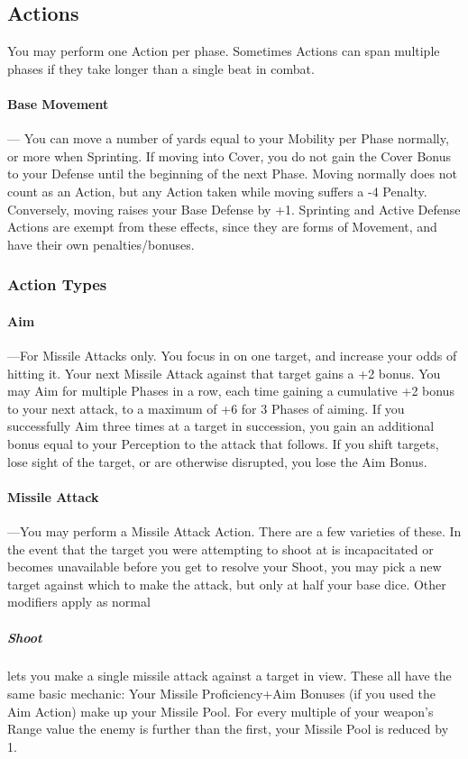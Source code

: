 \documentclass[oneside,11pt,english]{book}
\begin{document}
\subsection{Actions}\label{sec:combat-actions}
You may perform one Action per phase. Sometimes Actions can span multiple phases if they take longer
than a single beat in combat.

\paragraph{Base Movement}---\quad 
You can move a number of yards equal to your Mobility per Phase normally, or more
when Sprinting. If moving into Cover, you do not gain the Cover Bonus to your Defense until the
beginning of the next Phase.
Moving normally does not count as an Action, but any Action taken while moving suffers a -4 Penalty.
Conversely, moving raises your Base Defense by +1. Sprinting and Active Defense Actions are exempt
from these effects, since they are forms of Movement, and have their own penalties/bonuses.
\subsubsection{Action Types}
\paragraph{Aim}---\quad For Missile Attacks only. You focus in on one target,
and increase your odds of hitting it. Your next Missile Attack against that
target gains a +2 bonus. You may Aim for multiple Phases in a row, each time
gaining a cumulative +2 bonus to your next attack, to a maximum of +6 for 3
Phases of aiming. If you successfully Aim three times at a target in succession,
you gain an additional bonus equal to your Perception to the attack that
follows. If you shift targets, lose sight of the target, or are otherwise
disrupted, you lose the Aim Bonus. 

\paragraph{Missile Attack}\label{sec:missile-attack}
---\quad You may perform a Missile Attack Action. There are a few varieties of
these. In the event that the target you were attempting to shoot at is
incapacitated or becomes unavailable before you get to resolve your Shoot, you
may pick a new target against which to make the attack, but only at half your
base dice. Other modifiers apply as normal 
\subparagraph{Shoot} lets you make a single missile attack against a target in
view. These all have the same basic mechanic: Your Missile Proficiency+Aim
Bonuses (if you used the Aim Action) make up your Missile Pool. For every
multiple of your weapon’s Range value the enemy is further than the first, your
Missile Pool is reduced by 1. 
\end{document}
